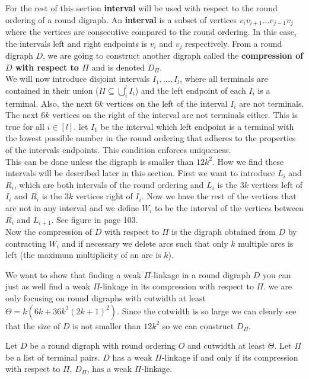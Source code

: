 For the rest of this section  \textbf{interval} will be used with respect to the round ordering of a round digraph. 
An \textbf{interval} is a subset of vertices $v_iv_{i+1}\dots v_{j-1}v_j$ where the vertices are consecutive compared to the round ordering. 
In this case, the intervals left and right endpoints is $v_i$ and $v_j$ respectively.
From a round digraph $D$, we are going to construct another digraph called the \textbf{compression of $D$ with respect to $\Pi$} and is denoted $D_{\Pi}$. \\
We will now introduce disjoint intervals $I_1,\dots ,I_l$, where all terminals are contained in their union ($\Pi \subseteq \bigcup_i ^l I_i$) and the left endpoint of each $I_i$ is a terminal.
Also, the next $6k$ vertices on the left of the interval $I_i$ are not terminals.
The next $6k$ vertices on the right of the interval are not terminals either. 
This is true for all $i\in [l]$. 
let $I_1$ be the interval which left endpoint is a terminal with the lowest possible number in the round ordering that adheres to the properties of the intervals endpoints.
This condition enforces uniqueness.\\
This can be done unless the digraph is smaller than $12k^2$.
How we find these intervals will be described later in this section.
First we want to introduce $L_i$ and $R_i$, which are both intervals of the round ordering and $L_i$ is the $3k$ vertices left of $I_i$ and $R_i$ is the $3k$ vertices right of $I_i$.
Now we have the rest of the vertices that are not in any interval and we define $W_i$ to be the interval of the vertices between $R_i$ and $L_{i+1}$.
See figure in \cite{bangJGT77} page 103.\\
Now the compression of $D$ with respect to $\Pi$ is the digraph obtained from $D$ by contracting $W_i$ and if necessary we delete arcs such that only $k$ multiple arcs is left (the maximum multiplicity of an arc is $k$).

We want to show that finding a weak $\Pi$-linkage in a round digraph $D$ you can just as well find a weak $\Pi$-linkage in its compression with respect to $\Pi$. 
we are only focusing on round digraphs with cutwidth at least $\Theta =k(6k+36k^2(2k+1)^2)$.
Since the cutwidth is so large we can clearly see that the size of $D$ is not smaller than $12k^2$ so we can construct $D_{\Pi}$.

\begin{lemma}
    Let $D$ be a round digraph with round ordering $O$ and cutwidth at least $\Theta$. 
    Let $\Pi$ be a list of terminal pairs. 
    $D$ has a weak $\Pi$-linkage if and only if its compression with respect to $\Pi$, $D_{\Pi}$, has a weak $\Pi$-linkage.
    \label{lemma:iwanttoprove}
\end{lemma} 

